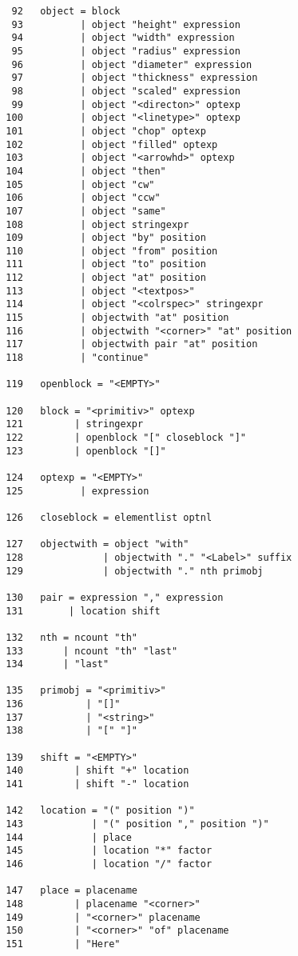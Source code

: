 \documentclass[11pt]{article}
\begin{document}
\begin{verbatim}
   92   object = block 
   93          | object "height" expression 
   94          | object "width" expression 
   95          | object "radius" expression 
   96          | object "diameter" expression 
   97          | object "thickness" expression 
   98          | object "scaled" expression 
   99          | object "<directon>" optexp 
  100          | object "<linetype>" optexp 
  101          | object "chop" optexp 
  102          | object "filled" optexp 
  103          | object "<arrowhd>" optexp 
  104          | object "then" 
  105          | object "cw" 
  106          | object "ccw" 
  107          | object "same" 
  108          | object stringexpr 
  109          | object "by" position 
  110          | object "from" position 
  111          | object "to" position 
  112          | object "at" position 
  113          | object "<textpos>" 
  114          | object "<colrspec>" stringexpr 
  115          | objectwith "at" position 
  116          | objectwith "<corner>" "at" position 
  117          | objectwith pair "at" position 
  118          | "continue" 

  119   openblock = "<EMPTY>" 

  120   block = "<primitiv>" optexp 
  121         | stringexpr 
  122         | openblock "[" closeblock "]" 
  123         | openblock "[]" 

  124   optexp = "<EMPTY>" 
  125          | expression 

  126   closeblock = elementlist optnl 

  127   objectwith = object "with" 
  128              | objectwith "." "<Label>" suffix 
  129              | objectwith "." nth primobj 

  130   pair = expression "," expression 
  131        | location shift 

  132   nth = ncount "th" 
  133       | ncount "th" "last" 
  134       | "last" 

  135   primobj = "<primitiv>" 
  136           | "[]" 
  137           | "<string>" 
  138           | "[" "]" 

  139   shift = "<EMPTY>" 
  140         | shift "+" location 
  141         | shift "-" location 

  142   location = "(" position ")" 
  143            | "(" position "," position ")" 
  144            | place 
  145            | location "*" factor 
  146            | location "/" factor 

  147   place = placename 
  148         | placename "<corner>" 
  149         | "<corner>" placename 
  150         | "<corner>" "of" placename 
  151         | "Here" 


\end{verbatim}
\end{document}
